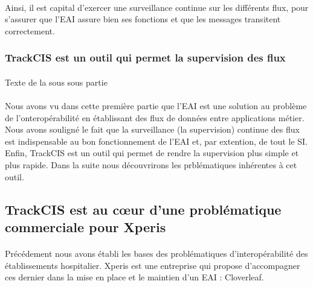 			\paragraph{}%
			
			\paragraph{}
			Ainsi, il est capital d'exercer une surveillance continue sur les différents
			flux, pour s'assurer que l'EAI assure bien ses fonctions et que les messages
			transitent correctement.
			
		\subsubsection{TrackCIS est un outil qui permet la supervision des flux}
			\paragraph{}%
			Texte de la sous sous partie
		
		\paragraph{}%
		Nous avons vu dans cette première partie que l'EAI est une solution au
		problème de l'onteropérabilité en établissant des flux de données entre
		applications métier. Nous avons souligné le fait que la surveillance (la
		supervision) continue des flux est indispensable au bon fonctionnement de
		l'EAI et, par extention, de tout le SI. Enfin, TrackCIS est un outil qui
		permet de rendre la supervision plus simple et plus rapide.\newline
		Dans la suite nous découvrirons les prblématiques inhérentes à cet outil.
		
	\subsection{TrackCIS est au cœur d'une problématique commerciale pour Xperis}
		\paragraph{}
		Précédement nous avons établi les bases des problématiques d'interopérabilité
		des établissements hospitalier. Xperis est une entreprise qui propose
		d'accompagner ces dernier dans la mise en place et le maintien d'un EAI :
		Cloverleaf.
		

